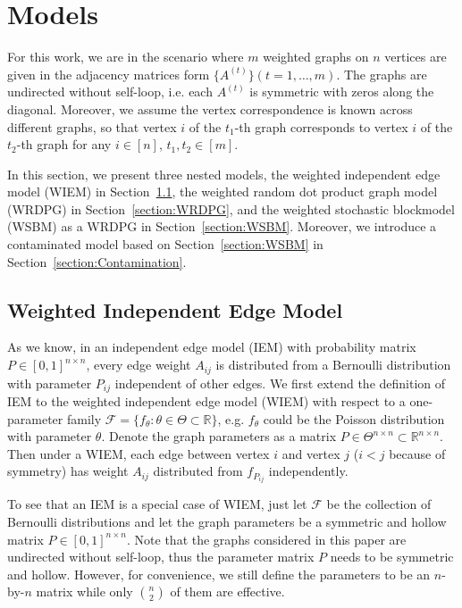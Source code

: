 \documentclass[a4paper]{article}
\begin{document}
\section{Models}
\label{section:model}

For this work, we are in the scenario where $m$ weighted graphs on $n$ vertices are given in the adjacency matrices form $\{ A^{(t)} \} (t = 1, \dotsc, m)$. The graphs are undirected without self-loop, i.e. each $A^{(t)}$ is symmetric with zeros along the diagonal. Moreover, we assume the vertex correspondence is known across different graphs, so that vertex $i$ of the $t_1$-th graph corresponds to vertex $i$ of the $t_2$-th graph for any $i \in [n]$, $t_1, t_2 \in [m]$.

In this section, we present three nested models, the weighted independent edge model (WIEM) in Section~\ref{section:WIEM}, the weighted random dot product graph model (WRDPG) in Section~\ref{section:WRDPG}, and the weighted stochastic blockmodel (WSBM) as a WRDPG in Section~\ref{section:WSBM}. Moreover, we introduce a contaminated model based on Section~\ref{section:WSBM} in Section~\ref{section:Contamination}.

\subsection{Weighted Independent Edge Model}
\label{section:WIEM}

As we know, in an independent edge model (IEM) \citep{bollobas2007phase} with probability matrix $P \in [0, 1]^{n \times n}$, every edge weight $A_{ij}$ is distributed from a Bernoulli distribution with parameter $P_{ij}$ independent of other edges.
We first extend the definition of IEM to the weighted independent edge model (WIEM) with respect to a one-parameter family $\mathcal{F} = \{ f_{\theta} : \theta \in \Theta \subset \mathbb{R} \}$, e.g. $f_{\theta}$ could be the Poisson distribution with parameter $\theta$. Denote the graph parameters as a matrix $P \in \Theta^{n \times n} \subset \mathbb{R}^{n \times n}$. Then under a WIEM, each edge between vertex $i$ and vertex $j$ ($i < j$ because of symmetry) has weight $A_{ij}$ distributed from $f_{P_{ij}}$ independently.

To see that an IEM is a special case of WIEM, just let $\mathcal{F}$ be the collection of Bernoulli distributions and let the graph parameters be a symmetric and hollow matrix $P \in [0, 1]^{n \times n}$.
Note that the graphs considered in this paper are undirected without self-loop, thus the parameter matrix $P$ needs to be symmetric and hollow. However, for convenience, we still define the parameters to be an $n$-by-$n$ matrix while only $n \choose 2$ of them are effective.
\end{document}
